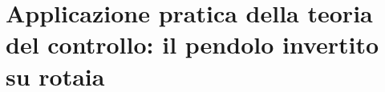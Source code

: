 \documentclass[a4paper, italian]{phduio}
\begin{document}
    \frontmatter        %

        \unibotitle

        
        

        \cleartorecto
        \tableofcontents    %
        \cleartorecto
        \listoffigures      %
        \cleartorecto
        \listoftables       %

       \part*{Applicazione pratica della teoria del controllo: il pendolo invertito su rotaia}

    \mainmatter         %

            \cleartorecto
            
            \cleartorecto
            
            \cleartorecto
            
            \cleartorecto
            
            \cleartorecto
            



    \backmatter
    \cleartorecto
    
\end{document}
